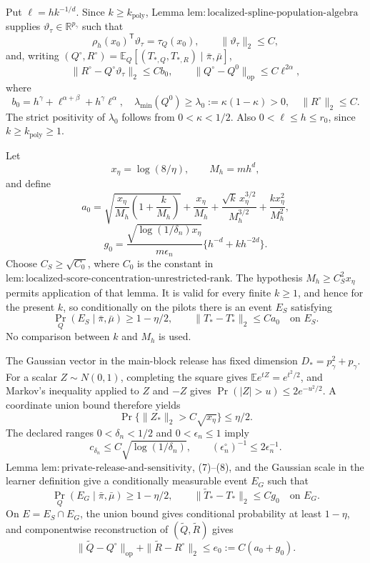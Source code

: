 Put \(\ell=hk^{-1/d}\).  Since \(k\ge k_{\mathrm{poly}}\), Lemma \(\mathrm{lem{:}localized\text{-}spline\text{-}population\text{-}algebra}\) supplies \(\vartheta_\tau\in\mathbb R^{p_\gamma}\) such that
\[
 \rho_h(x_0)^{\mathsf T}\vartheta_\tau=\tau_Q(x_0),
 \qquad \|\vartheta_\tau\|_2\le C,
\tag{1}
\]
and, writing \((Q^\circ,R^\circ)=\mathbb E_Q[(T_{*,Q},T_{*,R})\mid\bar\pi,\bar\mu]\),
\[
 \|R^\circ-Q^\circ\vartheta_\tau\|_2\le Cb_0,
 \qquad
 \|Q^\circ-Q^0\|_{\mathrm{op}}\le C\ell^{2\alpha},
\tag{2}
\]
where
\[
 b_0=h^\gamma+\ell^{\alpha+\beta}+h^\gamma\ell^\alpha,
 \quad \lambda_{\min}(Q^0)\ge\lambda_0:=\kappa(1-\kappa)>0,
 \quad \|R^\circ\|_2\le C.
\tag{3}
\]
The strict positivity of \(\lambda_0\) follows from \(0<\kappa<1/2\).  Also \(0<\ell\le h\le r_0\), since \(k\ge k_{\mathrm{poly}}\ge1\).

Let
\[
 x_\eta=\log(8/\eta),\qquad M_h=mh^d,
\]
and define
\[
 a_0=
 \sqrt{\frac{x_\eta}{M_h}\left(1+\frac{k}{M_h}\right)}
 +\frac{x_\eta}{M_h}
 +\frac{\sqrt{k}\,x_\eta^{3/2}}{M_h^{3/2}}
 +\frac{kx_\eta^2}{M_h^2},
\tag{4}
\]
\[
 g_0=\frac{\sqrt{\log(1/\delta_n)x_\eta}}{m\epsilon_n}
       \{h^{-d}+kh^{-2d}\}.
\tag{5}
\]
Choose \(C_S\ge\sqrt{C_0}\), where \(C_0\) is the constant in \(\mathrm{lem{:}localized\text{-}score\text{-}concentration\text{-}unrestricted\text{-}rank}\).  The hypothesis \(M_h\ge C_S^2x_\eta\) permits application of that lemma.  It is valid for every finite \(k\ge1\), and hence for the present \(k\), so conditionally on the pilots there is an event \(E_S\) satisfying
\[
 \Pr_Q(E_S\mid\bar\pi,\bar\mu)\ge1-\eta/2,
 \qquad \|T_*-T_*^\circ\|_2\le Ca_0
 \quad\text{on }E_S.
\tag{6}
\]
No comparison between \(k\) and \(M_h\) is used.

The Gaussian vector in the main-block release has fixed dimension \(D_*=p_\gamma^2+p_\gamma\).  For a scalar \(Z\sim N(0,1)\), completing the square gives \(\mathbb Ee^{tZ}=e^{t^2/2}\), and Markov's inequality applied to \(Z\) and \(-Z\) gives \(\Pr(|Z|>u)\le2e^{-u^2/2}\).  A coordinate union bound therefore yields
\[
 \Pr\{\|Z_*\|_2>C\sqrt{x_\eta}\}\le\eta/2.
\tag{7}
\]
The declared ranges \(0<\delta_n<1/2\) and \(0<\epsilon_n\le1\) imply
\[
 c_{\delta_n}\le C\sqrt{\log(1/\delta_n)},
 \qquad (\epsilon_n^\circ)^{-1}\le2\epsilon_n^{-1}.
\tag{8}
\]
Lemma \(\mathrm{lem{:}private\text{-}release\text{-}and\text{-}sensitivity}\), (7)--(8), and the Gaussian scale in the learner definition give a conditionally measurable event \(E_G\) such that
\[
 \Pr_Q(E_G\mid\bar\pi,\bar\mu)\ge1-\eta/2,
 \qquad \|\widetilde T_*-T_*\|_2\le Cg_0
 \quad\text{on }E_G.
\tag{9}
\]
On \(E=E_S\cap E_G\), the union bound gives conditional probability at least \(1-\eta\), and componentwise reconstruction of \((\widetilde Q,\widetilde R)\) gives
\[
 \|\widetilde Q-Q^\circ\|_{\mathrm{op}}
 +\|\widetilde R-R^\circ\|_2
 \le e_0:=C(a_0+g_0).
\tag{10}
\]

